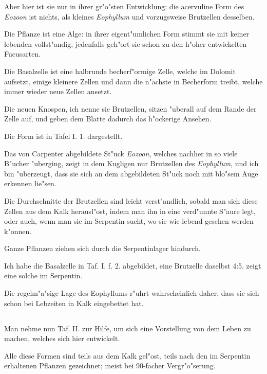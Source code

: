 \documentclass[a4paper, 11pt, oneside, german]{article}
\begin{document}
Aber hier ist sie nur in ihrer gr"o"sten Entwicklung: die acervuline Form des \emph{Eozoon} ist nichts, als kleines \emph{Eophyllum} und vorzugsweise Brutzellen desselben.

Die Pflanze ist eine Alge: in ihrer eigent"umlichen Form stimmt sie mit keiner lebenden vollst"andig, jedenfalls geh"ort sie schon zu den h"oher entwickelten Fucusarten.

Die Basalzelle ist eine halbrunde becherf"ormige Zelle, welche im Dolomit aufsetzt, einige kleinere Zellen und dann die n"achste in Becherform treibt, welche immer wieder neue Zellen ansetzt.

Die neuen Knospen, ich nenne sie Brutzellen, sitzen "uberall auf dem Rande der Zelle auf, und geben dem Blatte dadurch das h"ockerige Ansehen.

Die Form ist in Tafel I. 1. dargestellt.

Das von Carpenter abgebildete St"uck \emph{Eozoon}, welches nachher in so viele B"ucher "uberging, zeigt in dem Kugligen nur Brutzellen des \emph{Eophyllum}, und ich bin "uberzeugt, dass sie sich an dem abgebildeten St"uck noch mit blo"sem Auge erkennen lie"sen.

Die Durchschnitte der Brutzellen sind leicht verst"andlich, sobald man sich diese Zellen aus dem Kalk herausl"ost, indem man ihn in eine verd"unnte S"aure legt, oder auch, wenn man sie im Serpentin sucht, wo sie wie lebend gesehen werden k"onnen.

Ganze Pflanzen ziehen sich durch die Serpentinlager hindurch.

Ich habe die Basalzelle in Taf. I. f. 2. abgebildet, eine Brutzelle daselbst 4:5. zeigt eine solche im Serpentin.

Die regelm"a"sige Lage des Eophyllums r"uhrt wahrscheinlich daher, dass sie sich schon bei Lebzeiten in Kalk eingebettet hat.
\clearpage
\subsection{}
\paragraph{}
Man nehme nun Taf. II. zur Hilfe, um sich eine Vorstellung von dem Leben zu machen, welches sich hier entwickelt.

Alle diese Formen sind teils aus dem Kalk gel"ost, teils nach den im Serpentin erhaltenen Pflanzen gezeichnet; meist bei 90-facher Vergr"o"serung.
\end{document}
